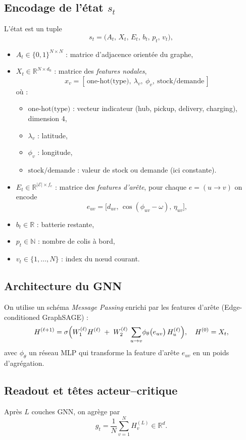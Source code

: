 \documentclass[11pt,a4paper]{article}
\newcommand{\R}{\mathbb{R}}
\begin{document}
\subsection{Encodage de l'état \(s_t\)}
L'état est un tuple 
\[
  s_t = \bigl(A_t,\,X_t,\,E_t,\,b_t,\,p_t,\,v_t\bigr),
\]
\begin{itemize}
  \item \(A_t\in\{0,1\}^{N\times N}\) : matrice d'adjacence orientée du graphe,
  \item \(X_t\in\R^{N\times d_0}\) : matrice des \emph{features nodales},   
    \[
      x_v = [\,\text{one-hot(type)},\ \lambda_v,\ \phi_v,\ \text{stock/demande}\,]
    \]
    où :
    \begin{itemize}
      \item \(\text{one-hot(type)}\) : vecteur indicateur (hub, pickup, delivery, charging), dimension 4,
      \item \(\lambda_v\) : latitude,
      \item \(\phi_v\) : longitude,
      \item \(\text{stock/demande}\) : valeur de stock ou demande (ici constante).
    \end{itemize}
  \item \(E_t\in\R^{|\mathcal{E}|\times f_e}\) : matrice des \emph{features d'arête},  
    pour chaque \(e=(u\to v)\) on encode  
    \[
      e_{uv}=\bigl[d_{uv},\,\cos(\phi_{uv}-\omega),\,\eta_{uv}\bigr],
    \]
  \item \(b_t\in\R\) : batterie restante,
  \item \(p_t\in\mathbb{N}\) : nombre de colis à bord,
  \item \(v_t\in\{1,\dots,N\}\) : index du nœud courant.
\end{itemize}

\subsection{Architecture du GNN}
On utilise un schéma \emph{Message Passing} enrichi par les features d'arête (Edge-conditioned GraphSAGE) :
\[
  H^{(\ell+1)} 
  = \sigma\Bigl(
    W_1^{(\ell)}H^{(\ell)}
    \;+\;
    W_2^{(\ell)}\,\sum_{u\to v}\!\phi_\theta\bigl(e_{uv}\bigr)\,H_u^{(\ell)}
  \Bigr),
  \quad
  H^{(0)} = X_t,
\]
avec \(\phi_\theta\) un réseau MLP qui transforme la feature d'arête \(e_{uv}\) en un poids d'agrégation.  

\subsection{Readout et têtes acteur–critique}
Après \(L\) couches GNN, on agrège par 
\[
  g_t = \frac{1}{N}\sum_{v=1}^N H_v^{(L)} \in \R^d.
\]
\end{document}
